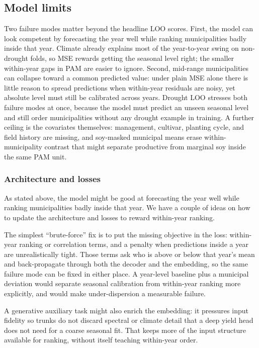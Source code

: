 \subsection{Model limits}
\label{sec:discussion-encoder-decoder}
Two failure modes matter beyond the headline LOO scores.
First, the model can look competent by forecasting the year well while ranking municipalities badly inside that year.
Climate already explains most of the year-to-year swing on non-drought folds, so MSE rewards getting the seasonal level right; the smaller within-year gaps in PAM are easier to ignore.
Second, mid-range municipalities can collapse toward a common predicted value: under plain MSE alone there is little reason to spread predictions when within-year residuals are noisy, yet absolute level must still be calibrated across years.
Drought LOO stresses both failure modes at once, because the model must predict an unseen seasonal level and still order municipalities without any drought example in training.
A further ceiling is the covariates themselves: management, cultivar, planting cycle, and field history are missing, and soy-masked municipal means erase within-municipality contrast that might separate productive from marginal soy inside the same PAM unit.

\subsubsection{Architecture and losses}
\label{sec:discussion-architecture-losses}

As stated above, the model might be good at forecasting the year well while ranking municipalities badly inside that year.
We have a couple of ideas on how to update the architecture and losses to reward within-year ranking.

The simplest ``brute-force'' fix is to put the missing objective in the loss: within-year ranking or correlation terms, and a penalty when predictions inside a year are unrealistically tight.
Those terms ask who is above or below that year's mean and back-propagate through both the decoder and the embedding, so the same failure mode can be fixed in either place.
A year-level baseline plus a municipal deviation would separate seasonal calibration from within-year ranking more explicitly, and would make under-dispersion a measurable failure.

A generative auxiliary task might also enrich the embedding: it pressures input fidelity so trunks do not discard spectral or climate detail that a deep yield head does not need for a coarse seasonal fit. That keeps more of the input structure available for ranking, without itself teaching within-year order.

